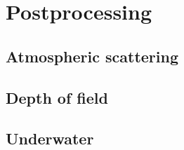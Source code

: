 \chapter{Postprocessing}

\section{Atmospheric scattering}


\section{Depth of field}


\section{Underwater}


